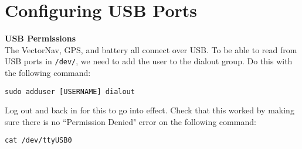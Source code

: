 \documentclass{article}
\begin{document}
\section*{Configuring USB Ports}
{\bf USB Permissions} \\
The VectorNav, GPS, and battery all connect over USB.
To be able to read from USB ports in \texttt{/dev/}, we need to add the user to the dialout group.
Do this with the following command:
\begin{center}
\texttt{sudo adduser [USERNAME] dialout}
\end{center}
Log out and back in for this to go into effect.
Check that this worked by making sure there is no ``Permission Denied" error on the following command:
\begin{center}
\texttt{cat /dev/ttyUSB0}
\end{center}
\end{document}
